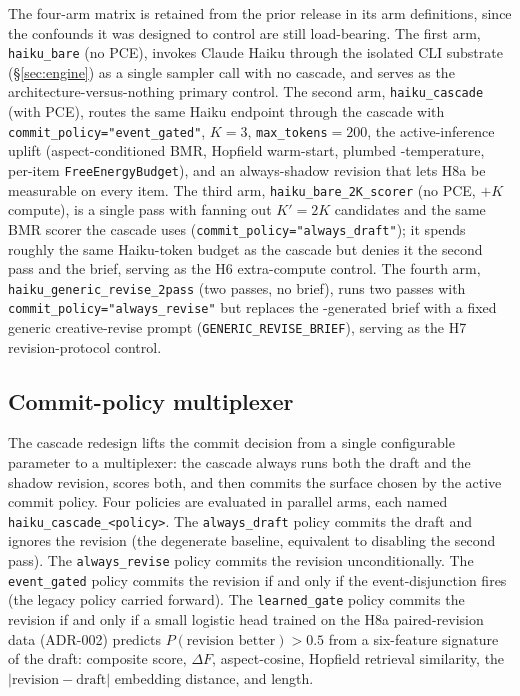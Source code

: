 The four-arm matrix is retained from the prior release in its arm definitions, since the confounds it was designed to control are still load-bearing. The first arm, \texttt{haiku\_bare} (no PCE), invokes Claude Haiku through the isolated CLI substrate (\S\ref{sec:engine}) as a single sampler call with no cascade, and serves as the architecture-versus-nothing primary control. The second arm, \texttt{haiku\_cascade} (with PCE), routes the same Haiku endpoint through the cascade with \texttt{commit\_policy="event\_gated"}, $K{=}3$, \texttt{max\_tokens}${}=200$, the active-inference uplift (aspect-conditioned BMR, Hopfield warm-start, plumbed -temperature, per-item \texttt{FreeEnergyBudget}), and an always-shadow revision that lets H8a be measurable on every item. The third arm, \texttt{haiku\_bare\_2K\_scorer} (no PCE, $+K$ compute), is a single pass with  fanning out $K'=2K$ candidates and the same  BMR scorer the cascade uses (\texttt{commit\_policy="always\_draft"}); it spends roughly the same Haiku-token budget as the cascade but denies it the second pass and the  brief, serving as the H6 extra-compute control. The fourth arm, \texttt{haiku\_generic\_revise\_2pass} (two passes, no  brief), runs two passes with \texttt{commit\_policy="always\_revise"} but replaces the -generated brief with a fixed generic creative-revise prompt (\texttt{GENERIC\_REVISE\_BRIEF}), serving as the H7 revision-protocol control.

\subsection{Commit-policy multiplexer}

The cascade redesign lifts the commit decision from a single configurable parameter to a multiplexer: the cascade always runs both the draft and the shadow revision, scores both, and then commits the surface chosen by the active commit policy. Four policies are evaluated in parallel arms, each named \texttt{haiku\_cascade\_<policy>}. The \texttt{always\_draft} policy commits the draft and ignores the revision (the degenerate baseline, equivalent to disabling the second pass). The \texttt{always\_revise} policy commits the revision unconditionally. The \texttt{event\_gated} policy commits the revision if and only if the  event-disjunction fires (the legacy policy carried forward). The \texttt{learned\_gate} policy commits the revision if and only if a small logistic head trained on the H8a paired-revision data (ADR-002) predicts $P(\text{revision better})>0.5$ from a six-feature signature of the draft: composite score, $\Delta F$, aspect-cosine, Hopfield retrieval similarity, the $|\text{revision}-\text{draft}|$ embedding distance, and length.


